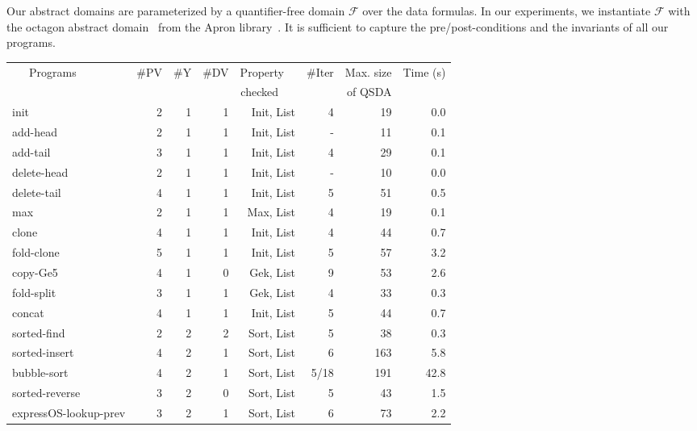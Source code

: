 \documentclass{llncs}
\newcommand{\F}{\mathcal{F}}
\begin{document}
Our abstract domains are parameterized by a quantifier-free domain $\F$ over the data formulas. In our experiments, we instantiate $\F$ with the octagon abstract domain~\cite{octagon} from the Apron library~\cite{apron}. It is sufficient to capture the pre/post-conditions and the invariants of all our programs.


\begin{table*}[thb]
	\centering


{\scriptsize
\begin{tabular}{|l| r | r | r | r|| r | r |r||}
	\hline
	~~~Programs & \#PV & \#Y & \#DV & Property~~ & \#Iter & Max. size & Time (s) \\
	 & & & & checked~~~ & & of QSDA & \\  \hline \hline

{\sc init}	& 2 & 1 & 1 & {\sc Init, List} & 4 & 19 & 0.0 \\	\hline
{\sc add-head} & 2 & 1 & 1 & {\sc Init, List} & - & 11 & 0.1  \\ \hline
{\sc add-tail}  & 3 & 1 & 1 & {\sc Init, List} & 4 & 29 & 0.1  \\ \hline
{\sc delete-head} & 2 & 1 & 1 & {\sc Init, List} & - & 10 & 0.0 \\ \hline
{\sc delete-tail}  & 4 & 1 & 1 & {\sc Init, List} & 5 & 51 & 0.5  \\ \hline
{\sc max}	& 2 & 1 & 1 & {\sc Max, List} & 4 & 19 & 0.1   \\ \hline
{\sc clone}    & 4 & 1 & 1 & {\sc Init, List} & 4 & 44 & 0.7  \\ \hline
{\sc fold-clone}  & 5 & 1 & 1 & {\sc Init, List} & 5 & 57 &  3.2 \\ \hline
{\sc copy-Ge5}  &  4 & 1 & 0 & {\sc Gek, List} & 9 & 53 & 2.6  \\ \hline
{\sc fold-split} & 3 &  1 & 1 & {\sc Gek, List} & 4 & 33 & 0.3 \\ \hline
{\sc concat}  & 4 & 1 & 1 & {\sc Init, List} & 5 & 44 & 0.7 \\ \hline
{\sc sorted-find} & 2 & 2 & 2 & {\sc Sort, List} & 5 & 38 & 0.3 \\ \hline
{\sc sorted-insert} & 4 & 2 & 1 & {\sc Sort, List} & 6 & 163 & 5.8 \\ \hline
{\sc bubble-sort} & 4 & 2 & 1 & {\sc Sort, List} & 5/18 & 191 & 42.8 \\ \hline
{\sc sorted-reverse} & 3 & 2 & 0 & {\sc Sort, List} & 5 & 43 & 1.5 \\ \hline
{\sc expressOS-lookup-prev} & 3 & 2 & 1 & {\sc Sort, List} & 6 & 73 & 2.2 \\ \hline \hline


\end{tabular}}
\end{table*}
\end{document}
